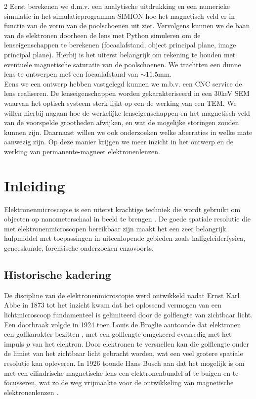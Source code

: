 \documentclass[we,twoside,openright,a4paper,11pt]{uantwerpenbamathesis}
\begin{document}
\begin{multicols}{2}
Eerst berekenen we d.m.v. een analytische uitdrukking en een numerieke simulatie in het simulatieprogramma SIMION hoe het magnetisch veld er in functie van de vorm van de poolschoenen uit ziet. Vervolgens kunnen we de baan van de elektronen doorheen de lens met Python simuleren om de lenseigenschappen te berekenen (focaalafstand, object principal plane, image principal plane). Hierbij is het uiterst belangrijk om rekening te houden met eventuele magnetische saturatie van de poolschoenen. We trachtten een dunne lens te ontwerpen met een focaalafstand van $\sim11.5\text{mm}$.\\

Eens we een ontwerp hebben vastgelegd kunnen we m.b.v. een CNC service de lens realiseren. De lenseigenschappen worden gekarakteriseerd in een 30keV SEM waarvan het optisch systeem sterk lijkt op een de werking van een TEM. We willen hierbij nagaan hoe de werkelijke lenseigenschappen en het magnetisch veld van de voorspelde grootheden afwijken, en wat de mogelijke storingen zouden kunnen zijn. Daarnaast willen we ook onderzoeken welke aberraties in welke mate aanwezig zijn. Op deze manier krijgen we meer inzicht in het ontwerp en de werking van permanente-magneet elektronenlenzen.
\end{multicols}
\makeatother

\pagestyle{fancy}

\chapter{Inleiding}\label{ch:inleiding}
Elektronenmicroscopie is een uiterst krachtige techniek die wordt gebruikt om objecten op nanometerschaal in beeld te brengen \cite{EM_Overview}. De goede spatiale resolutie die met elektronenmicroscopen bereikbaar zijn maakt het een zeer belangrijk hulpmiddel met toepassingen in uiteenlopende gebieden zoals halfgeleiderfysica, geneeskunde, forensische onderzoeken enzovoorts. 

\section{Historische kadering}De discipline van de elektronenmicroscopie werd ontwikkeld nadat Ernst Karl Abbe in 1873 tot het inzicht kwam dat het oplossend vermogen van een lichtmicroscoop fundamenteel is gelimiteerd door de golflengte van zichtbaar licht. Een doorbraak volgde in 1924 toen Louis de Broglie aantoonde dat elektronen een golfkarakter bezitten \cite{deBroglie1924}, met een golflengte omgekeerd evenredig met het impuls $p$ van het elektron. Door elektronen te versnellen kan die golflengte onder de limiet van het zichtbaar licht gebracht worden, wat een veel grotere spatiale resolutie kan opleveren. In 1926 toonde Hans Busch aan dat het mogelijk is om met een cilindrische magnetische lens een elektronenbundel af te buigen en te focusseren, wat zo de weg vrijmaakte voor de ontwikkeling van magnetische elektronenlenzen \cite{Busch1926}.\\
\end{document}
